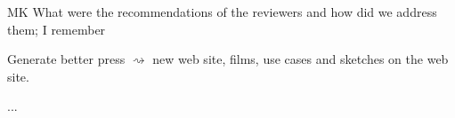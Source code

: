 \begin{todolist}{MK What were the recommendations of the reviewers and how did we address them; I
    remember}
\item Generate better press $\rightsquigarrow$ new web site, films, use cases and sketches on the web
  site.
\item ...
\end{todolist}

